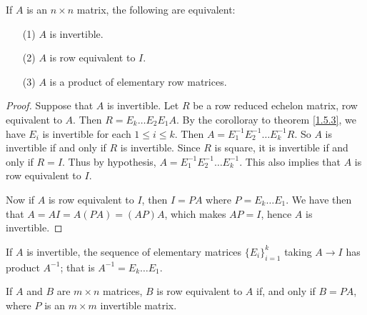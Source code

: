\begin{theorem}\label{1.5.4}
    If $A$ is an  $n \times n$ matrix, the following are equivalent:
        \begin{enumerate}
            \item[(1)] $A$ is invertible.

            \item[(2)] $A$ is row equivalent to  $I$.

            \item[(3)] $A$ is a product of elementary row matrices.
        \end{enumerate}
\end{theorem}
\begin{proof}
    Suppose that $A$ is invertible. Let $R$ be a row reduced echelon matrix, row equivalent to  
    $A$. Then  $R=E_k \dots E_2E_1A$. By the corolloray to theorem \ref{1.5.3}, we have $E_i$ is 
    invertible for each $1 \leq i \leq k$. Then  $A=E_1^{-1}E_2^{-1} \dots E_k^{-1}R$. So  $A$ 
    is invertible if and only if  $R$ is invertible. Since $R$ is square, it is invertible if 
    and only if  $R=I$. Thus by hypothesis, $A=E_1^{-1}E_2^{-1} \dots E_k^{-1}$. This also implies
    that $A$ is row equivalent to  $I$.

    Now if  $A$ is row equivalent to  $I$, then  $I=PA$ where  $P=E_k \dots E_1$. We have then that
    $A=AI=A(PA)=(AP)A$, which makes $AP=I$, hence  $A$ is invertible.
\end{proof}
\begin{corollary}
    If $A$ is invertible, the sequence of elementary matrices  $\{E_i\}_{i=1}^k$ taking $A
    \rightarrow I$ has product $A^{-1}$; that is $A^{-1}=E_k \dots E_1$.
\end{corollary}
\begin{corollary}
    If $A$ and  $B$ are  $m \times n$ matrices,  $B$ is row equivalent to  $A$ if, and only if
    $B=PA$, where $P$ is an  $m \times m$ invertible matrix.
\end{corollary}

